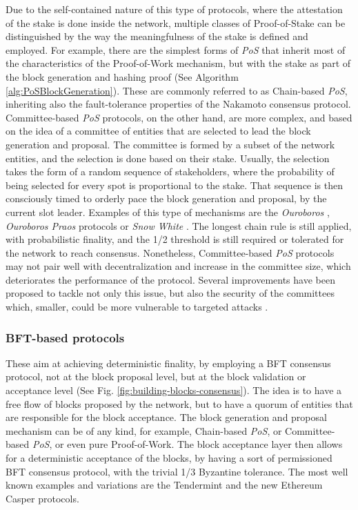 \documentclass[journal]{IEEEtran}
\begin{document}
Due to the self-contained nature of this type of protocols, where the
attestation of the stake is done inside the network, multiple classes
of Proof-of-Stake can be distinguished by the way the meaningfulness of
the stake is defined and employed. For example, there are the simplest forms of \emph{PoS} that inherit most
of the characteristics of the Proof-of-Work mechanism, but with the
stake as part of the block generation and hashing proof (See Algorithm \ref{alg:PoSBlockGeneration}).
These are commonly referred to as Chain-based \emph{PoS}, inheriting also the
fault-tolerance properties of the Nakamoto consensus protocol.
Committee-based \emph{PoS} protocols, on the other hand, are more complex,
and based on the idea of a committee of entities that are 
selected to lead the block generation and proposal. The committee is
formed by a subset of the network entities, and the selection is done
based on their stake. Usually, the selection takes the form of a random
sequence of stakeholders, where the probability of being selected
for every spot is proportional to the stake. That sequence is then 
consciously timed to orderly pace the block generation and proposal, 
by the current slot leader. Examples of this type of mechanisms are
the \emph{Ouroboros} \cite{kiayias2017ouroboros}, \emph{Ouroboros Praos} \cite{david2018ouroboros} protocols
or \emph{Snow White} \cite{daian2019snow}. The longest chain rule is
still applied, with probabilistic finality, and the 1/2 threshold is
still required or tolerated for the network to reach consensus. Nonetheless,
Committee-based \emph{PoS} protocols may not pair well with decentralization and 
increase in the committee size, which deteriorates the performance of the
protocol. Several improvements have been proposed to tackle not only this
issue, but also the security of the committees which, smaller, could be more
vulnerable to targeted attacks \cite{david2018ouroboros}.
  
\subsubsection{BFT-based protocols}

These aim at achieving deterministic finality, by employing a BFT
consensus protocol, not at the block proposal level, but at the
block validation or acceptance level (See Fig. \ref{fig:building-blocks-consensus}).
The idea is to have a free flow of blocks
proposed by the network, but to have a quorum of entities that
are responsible for the block acceptance. The block generation and proposal mechanism
can be of any kind, for example, Chain-based \emph{PoS}, or Committee-based \emph{PoS},
or even pure Proof-of-Work. The block acceptance layer then allows
for a deterministic acceptance of the blocks, by having a sort of permissioned
BFT consensus protocol, with the trivial 1/3 Byzantine tolerance. The most well known examples
and variations are the Tendermint \cite{buchman2016tendermint} and the new Ethereum Casper 
\cite{buterin2017casper} protocols.
\end{document}
